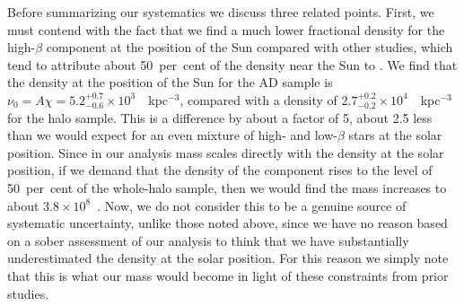 Before summarizing our systematics we discuss three related points. First, we must contend with the fact that we find a much lower fractional density for the high-$\beta$ \gse component at the position of the Sun compared with other studies, which tend to attribute about 50~per~cent of the density near the Sun to \gse \parencite{belokurov18,lancaster19,iorio21}. We find that the density at the position of the Sun for the AD sample is $\nu_{0} = A\chi = 5.2^{+0.7}_{-0.6}\times 10^{3}$~\Msun~kpc$^{-3}$, compared with a density of $2.7^{+0.2}_{-0.2}\times 10^{4}$~\Msun~kpc$^{-3}$ for the halo sample. This is a difference by about a factor of 5, about 2.5 less than we would expect for an even mixture of high- and low-$\beta$ stars at the solar position. Since in our analysis mass scales directly with the density at the solar position, if we demand that the density of the \gse component rises to the level of 50~per~cent of the whole-halo sample, then we would find the mass increases to about $3.8\times10^{8}$~\Msun. Now, we do not consider this to be a genuine source of systematic uncertainty, unlike those noted above, since we have no reason based on a sober assessment of our analysis to think that we have substantially underestimated the density at the solar position. For this reason we simply note that this is what our mass would become in light of these constraints from prior studies.

